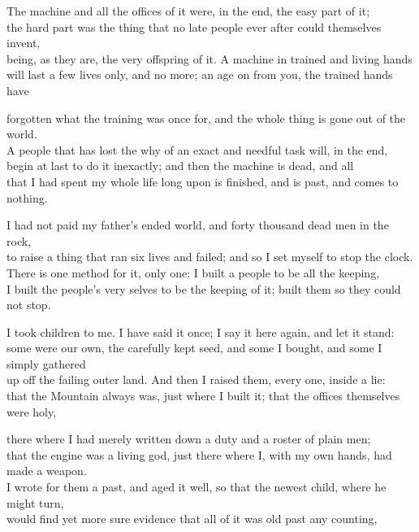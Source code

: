 \begin{scripture}
The machine and all the offices of it were, in the end, the easy part of it; \\
the hard part was the thing that no late people ever after could themselves invent, \\
being, as they are, the very offspring of it. A machine in trained and living hands \\
will last a few lives only, and no more; an age on from you, the trained hands have \\
\medskip

forgotten what the training was once for, and the whole thing is gone out of the world. \\
A people that has lost the why of an exact and needful task will, in the end, \\
begin at last to do it inexactly; and then the machine is dead, and all \\
that I had spent my whole life long upon is finished, and is past, and comes to nothing. \\
\medskip

I had not paid my father's ended world, and forty thousand dead men in the rock, \\
to raise a thing that ran six lives and failed; and so I set myself to stop the clock. \\
There is one method for it, only one: I built a people to be all the keeping, \\
I built the people's very selves to be the keeping of it; built them so they could not stop. \\
\medskip

I took children to me. I have said it once; I say it here again, and let it stand: \\
some were our own, the carefully kept seed, and some I bought, and some I simply gathered \\
up off the failing outer land. And then I raised them, every one, inside a lie: \\
that the Mountain always was, just where I built it; that the offices themselves were holy, \\
\medskip

there where I had merely written down a duty and a roster of plain men; \\
that the engine was a living god, just there where I, with my own hands, had made a weapon. \\
I wrote for them a past, and aged it well, so that the newest child, where he might turn, \\
would find yet more sure evidence that all of it was old past any counting, \\
\medskip


\end{scripture}
